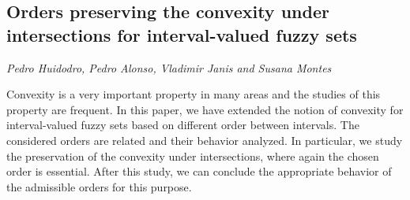 \documentclass[../booklet.tex]{subfiles}
\begin{document}
\subsection[Orders preserving the convexity under intersections for interval-valued fuzzy sets. {\it Pedro Huidodro, Pedro Alonso, Vladimir Janis and Susana Montes}]{Orders preserving the convexity under intersections for interval-valued fuzzy sets}
   

\begin{center}
  {\it Pedro Huidodro, Pedro Alonso, Vladimir Janis and Susana Montes}
\end{center}



Convexity is a very important property in many areas and the studies of this property are frequent. In this paper, we have extended the notion of convexity for interval-valued fuzzy sets based on different order between intervals. The considered orders are related and their behavior analyzed. In particular, we study the preservation of the convexity under intersections, where again the chosen order is essential. After this study, we can conclude the appropriate behavior of the admissible orders for this purpose.

\end{document}
